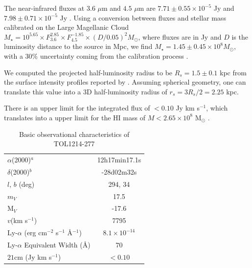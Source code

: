 \documentclass[a4,useAMS,usenatbib,usegraphicx]{mn2e}
\begin{document}
The near-infrared fluxes at $3.6$ $\mu$m and $4.5$ $\mu$m are
$7.71\pm0.55\times 10^{-5}$ Jy and $7.98\pm0.71\times 10^{-5}$ Jy
\citep{2008ApJ...678..804E}.
Using a conversion between fluxes and
stellar mass calibrated on the Large Magellanic Cloud $M_{\star} =
10^{5.65} \times F_{3.6}^{2.85} \times F_{4.5}^{-1.85} \times
(D/0.05)^2 M_{\odot}$, where fluxes are in Jy and $D$ is the luminosity
distance to the source in Mpc, we find $M_{\star} = 1.45\pm0.45\times 10^{8}
M_{\odot}$, with a $30\%$ uncertainty coming from the calibration
process \citep{2012AJ....143..139E}.  

We computed the projected half-luminosity radius to be $R_s=1.5\pm0.1$ kpc 
from the surface intensity profiles reported by \citep{2003A&A...410..481N}. 
Assuming spherical geometry, one can translate this value into a 3D
half-luminosity radius of $r_s=3R_s/2=2.25$ kpc.

There is an upper limit for the  
integrated flux of $<0.10$ Jy km s$^{-1}$, which translates into a
upper limit for the HI mass of $M<2.65\times 10^{8}$ M$_{\odot}$
\citep{pustilnikmartin07}.  



\begin{table}
\begin{center}
\begin{tabular}{lc}\hline
$\alpha$(2000)$^{a}$ & 12h17min17.1s\\
$\delta$(2000)$^{b}$ & -28d02m32s\\
$l$, $b$ (deg) & 294, 34\\
$m_V$ & 17.5\\
  M$_V$ & -17.6\\ 
$v$(km s$^{-1}$) & 7795\\
Ly-$\alpha$ (erg cm$^{-2}$ s$^{-1}$ \AA$^{-1}$)& $8.1\times 10^{-14}$ \\
Ly-$\alpha$ Equivalent Width (\AA) & $70$\\
$21$cm (Jy km s$^{-1}$)& $<0.10$ \\\hline
\end{tabular}
\end{center}
\caption{Basic observational characteristics of TOL1214-277
  \citep{Thuan97}\label{obstable}} 
\end{table}
\end{document}
